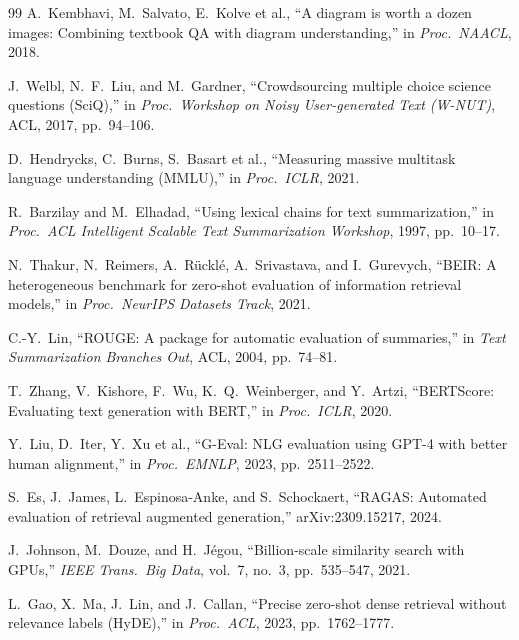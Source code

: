 \documentclass[conference]{IEEEtran}
\begin{document}
\begin{thebibliography}{99}
 A.\ Kembhavi, M.\ Salvato, E.\ Kolve et al., ``A diagram is worth a dozen images: Combining textbook QA with diagram understanding,'' in \emph{Proc.\ NAACL}, 2018.

 J.\ Welbl, N.\ F.\ Liu, and M.\ Gardner, ``Crowdsourcing multiple choice science questions (SciQ),'' in \emph{Proc.\ Workshop on Noisy User-generated Text (W-NUT)}, ACL, 2017, pp.~94--106.

 D.\ Hendrycks, C.\ Burns, S.\ Basart et al., ``Measuring massive multitask language understanding (MMLU),'' in \emph{Proc.\ ICLR}, 2021.

 R.\ Barzilay and M.\ Elhadad, ``Using lexical chains for text summarization,'' in \emph{Proc.\ ACL Intelligent Scalable Text Summarization Workshop}, 1997, pp.~10--17.

 N.\ Thakur, N.\ Reimers, A.\ R\"uckl\'e, A.\ Srivastava, and I.\ Gurevych, ``BEIR: A heterogeneous benchmark for zero-shot evaluation of information retrieval models,'' in \emph{Proc.\ NeurIPS Datasets Track}, 2021.

 C.-Y.\ Lin, ``ROUGE: A package for automatic evaluation of summaries,'' in \emph{Text Summarization Branches Out}, ACL, 2004, pp.~74--81.

 T.\ Zhang, V.\ Kishore, F.\ Wu, K.\ Q.\ Weinberger, and Y.\ Artzi, ``BERTScore: Evaluating text generation with BERT,'' in \emph{Proc.\ ICLR}, 2020.

 Y.\ Liu, D.\ Iter, Y.\ Xu et al., ``G-Eval: NLG evaluation using GPT-4 with better human alignment,'' in \emph{Proc.\ EMNLP}, 2023, pp.~2511--2522.

 S.\ Es, J.\ James, L.\ Espinosa-Anke, and S.\ Schockaert, ``RAGAS: Automated evaluation of retrieval augmented generation,'' arXiv:2309.15217, 2024.

 J.\ Johnson, M.\ Douze, and H.\ J\'egou, ``Billion-scale similarity search with GPUs,'' \emph{IEEE Trans.\ Big Data}, vol.~7, no.~3, pp.~535--547, 2021.

 L.\ Gao, X.\ Ma, J.\ Lin, and J.\ Callan, ``Precise zero-shot dense retrieval without relevance labels (HyDE),'' in \emph{Proc.\ ACL}, 2023, pp.~1762--1777.

\end{thebibliography}
\end{document}
